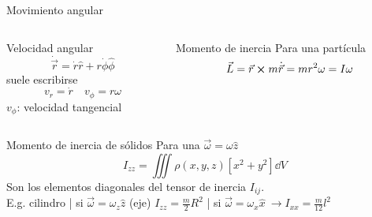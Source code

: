 \documentclass[serif]{beamer}
\begin{document}
\begin{frame}{Movimiento angular}
\begin{columns}[c]
	\begin{column}{0.45\textwidth}
		\begin{block}{Velocidad angular}
		\[
			\dot{\vec{r}} = \dot{r} \hat{r} + r \dot{\phi} \hat{\phi}
		\]
		suele escribirse
		\[ v_r = \dot{r} \quad v_\phi= r \omega \]
		\(v_\phi\): velocidad tangencial
		\end{block}
	\end{column}

	\pause

	\begin{column}{0.45\textwidth}
		\begin{block}{Momento de inercia}
			Para una partícula
			\[
				\vec{L}= \vec{r} \cp m \dot{\vec{r}} = m r^2 \omega= I \omega
			\]
		\end{block}
	\end{column}
\end{columns}
	
	\pause
	\begin{block}{Momento de inercia de sólidos}
		Para una \(\vec{\omega}= \omega \hat{z}\)
		\[
			I_{zz}= \iiint \rho(x,y,z) \left[ x^2+y^2 \right] \dd{V}
		\]
		Son los elementos diagonales del tensor de inercia \(I_{ij}\).\\
		\pause
		E.g. cilindro | si \(\vec{\omega}= \omega_z \hat{z}\) (eje) \(I_{zz}= \frac{m}{2}R^2\) | si \(\vec{\omega}= \omega_x \hat{x}\ \rightarrow I_{xx}= \frac{m}{12} l^2\)
	\end{block}

\end{frame}
\end{document}
